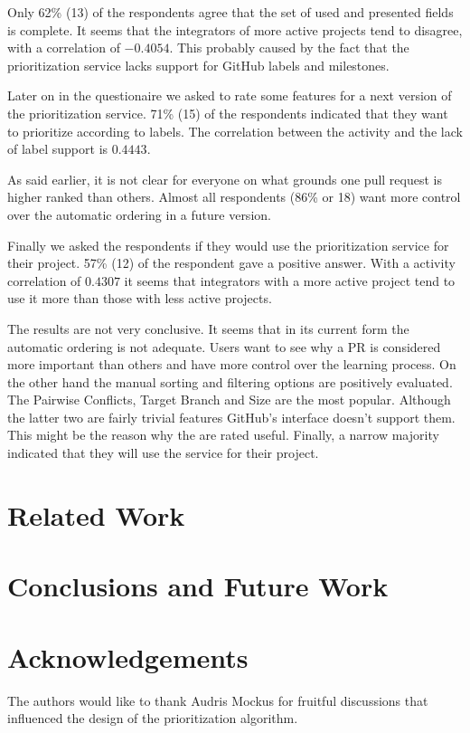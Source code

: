 \documentclass[conference]{IEEEtran}
\begin{document}
Only 62\% (13) of the respondents agree that the set of used and presented fields is complete.
It seems that the integrators of more active projects tend to disagree, with a correlation of $-0.4054$.
This probably caused by the fact that the prioritization service lacks support for GitHub labels and milestones.

Later on in the questionaire we asked to rate some features for a next version of the prioritization service.
71\% (15) of the respondents indicated that they want to prioritize according to labels.
The correlation between the activity and the lack of label support is $0.4443$.

As said earlier, it is not clear for everyone on what grounds one pull request is higher ranked than others.
Almost all respondents (86\% or 18) want more control over the automatic ordering in a future version.

Finally we asked the respondents if they would use the prioritization service for their project.
57\% (12) of the respondent gave a positive answer.
With a activity correlation of $0.4307$ it seems that integrators with a more active project tend to use it more than those with less active projects.

The results are not very conclusive.
It seems that in its current form the automatic ordering is not adequate.
Users want to see why a PR is considered more important than others and have more control over the learning process.
On the other hand the manual sorting and filtering options are positively evaluated.
The Pairwise Conflicts, Target Branch and Size are the most popular.
Although the latter two are fairly trivial features GitHub's interface doesn't support them.
This might be the reason why the are rated useful.
Finally, a narrow majority indicated that they will use the service for their project.

\section{Related Work}

\section{Conclusions and Future Work}

\section*{Acknowledgements} The authors would like to thank Audris Mockus for
fruitful discussions that influenced the design of the prioritization algorithm.



\end{document}
